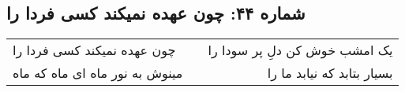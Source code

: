 \begin{center}
\section*{شماره ۴۴: چون عهده نمیکند کسی فردا را}
\label{sec:044}
\begin{longtable}{l p{0.5cm} r}
چون عهده نمیکند کسی فردا را
&&
یک امشب خوش کن دلِ پر سودا را
\\
مینوش به نور ماه ای ماه که ماه
&&
بسیار بتابد که نیابد ما را
\\
\end{longtable}
\end{center}
